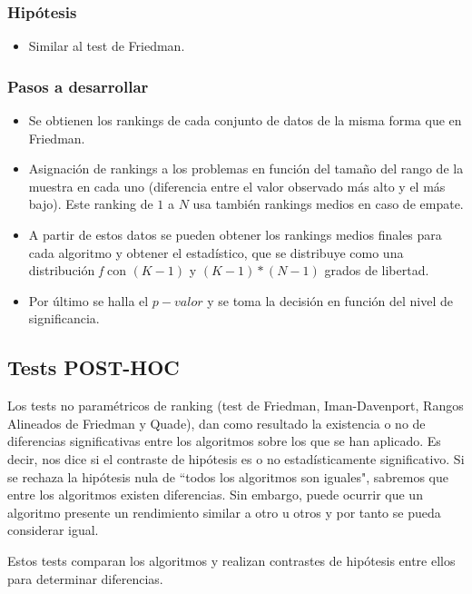 \subsubsection{Hipótesis}
\begin{itemize}
\item Similar al test de Friedman.
\end{itemize}

\subsubsection{Pasos a desarrollar}
\begin{itemize}
\item Se obtienen los rankings de cada conjunto de datos de la misma forma que en Friedman.
\item Asignación de rankings a los problemas en función del tamaño del rango de la muestra en cada
uno (diferencia entre el valor observado más alto y el más bajo). Este ranking de $1$ a $N$ usa también
rankings medios en caso de empate.
\item A partir de estos datos se pueden obtener los rankings medios finales para cada algoritmo y obtener
el estadístico, que se distribuye como una distribución \textit{f} con $(K-1)$ y $(K-1)*(N-1)$ grados de libertad.
\item Por último se halla el $p-valor$ y se toma la decisión en función del nivel de significancia.
\end{itemize}


\subsection{Tests POST-HOC}
Los tests no paramétricos de ranking (test de Friedman, Iman-Davenport, Rangos Alineados de Friedman y Quade),
dan como resultado la existencia o no de diferencias significativas entre los algoritmos sobre los que se han
aplicado. Es decir, nos dice si el contraste de hipótesis es o no estadísticamente significativo. Si se rechaza
la hipótesis nula de ``todos los algoritmos son iguales", sabremos que entre los algoritmos existen diferencias.
Sin embargo, puede ocurrir que un algoritmo presente un rendimiento similar a otro u otros y por tanto se pueda
considerar igual.

Estos tests comparan los algoritmos y realizan contrastes de hipótesis entre ellos para determinar diferencias.

